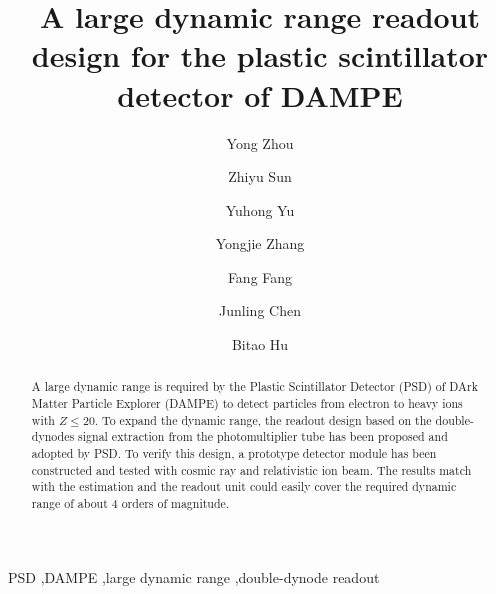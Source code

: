 \documentclass[preprint, times]{elsarticle}
\begin{document}
\begin{frontmatter}

\title{A large dynamic range readout design for the plastic scintillator detector of DAMPE}

\author[imp,lzu,ucas]{Yong Zhou}
\author[imp]{Zhiyu Sun}

\author[imp]{Yuhong Yu}

\author[imp]{Yongjie Zhang}
\author[imp]{Fang Fang}
\author[imp]{Junling Chen}

\author[lzu]{Bitao Hu}

\address[imp]{Institute of Modern Physics, Chinese Academy of Sciences,  509 Nanchang Road,  Lanzhou,  730000,  P.R.China}
\address[lzu]{School of Nuclear Science and Technology,  Lanzhou University,  222 South Tianshui Road,  Lanzhou,  730000,  P.R.China}
\address[ucas]{Graduate University of the Chinese Academy of Sciences,  19A Yuquan Road,  Beijing,  100049,  P.R.China}
\begin{abstract}

A large dynamic range is required by the Plastic Scintillator Detector (PSD) of DArk Matter Particle Explorer (DAMPE) to detect particles from electron to heavy ions with $Z\leq 20$.
To expand the dynamic range, the readout design based on the double-dynodes signal extraction from the photomultiplier tube has been proposed and adopted by PSD. 
To verify this design, a prototype detector module has been constructed and tested with cosmic ray and relativistic ion beam.
The results match with the estimation and the readout unit could easily cover the required dynamic range of about 4 orders of magnitude.

\end{abstract}

\begin{keyword}
PSD
\sep DAMPE
\sep large dynamic range
\sep double-dynode readout


\end{keyword}

\end{frontmatter}

\linenumbers
\end{document}
